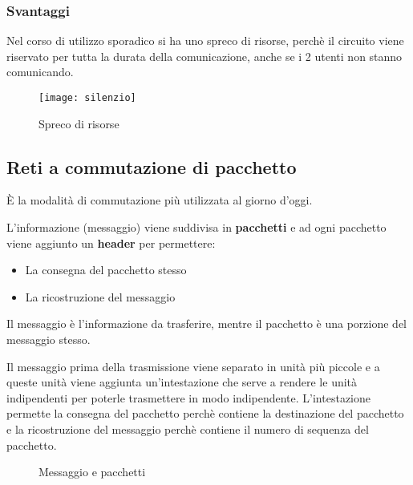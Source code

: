 \documentclass[a4paper]{article}
\begin{document}
\subsubsection{Svantaggi}
Nel corso di utilizzo sporadico si ha uno spreco di risorse, perchè il circuito
viene riservato per tutta la durata della comunicazione, anche se i 2 utenti
non stanno comunicando.
\begin{figure}[H]
  \centering
  \texttt{[image: silenzio]}
  \caption{Spreco di risorse}
\end{figure}

\subsection{Reti a commutazione di pacchetto}
È la modalità di commutazione più utilizzata al giorno d'oggi.

\noindent
L'informazione (messaggio) viene suddivisa in \textbf{pacchetti} e ad ogni
pacchetto viene aggiunto un \textbf{header} per permettere:
\begin{itemize}
  \item La consegna del pacchetto stesso
  \item La ricostruzione del messaggio
\end{itemize}

Il messaggio è l'informazione da trasferire, mentre il pacchetto è una porzione
del messaggio stesso.

\noindent
Il messaggio prima della trasmissione viene separato in unità più piccole e a
queste unità viene aggiunta un'intestazione che serve a rendere le unità indipendenti
per poterle trasmettere in modo indipendente. L'intestazione permette la consegna del
pacchetto perchè contiene la destinazione del pacchetto e la ricostruzione del messaggio
perchè contiene il numero di sequenza del pacchetto.
\begin{figure}[H]
  \centering
  \caption{Messaggio e pacchetti}
\end{figure}
\end{document}
